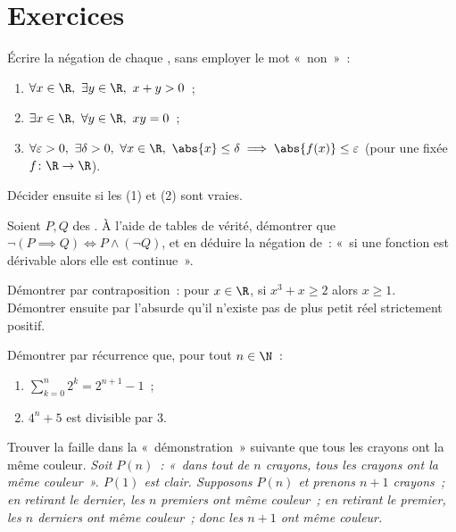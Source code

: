 \section{Exercices}

\begin{exercise}[$\star$]\label{exo:b1:logic:1}
Écrire la négation de chaque , sans employer le mot «~non~»~:
\begin{enumerate}
  \item $\forall x \in \R,\ \exists y \in \R,\ x + y > 0$~;
  \item $\exists x \in \R,\ \forall y \in \R,\ xy = 0$~;
  \item $\forall \varepsilon > 0,\ \exists \delta > 0,\ \forall x \in
        \R,\ \abs{x} \leq \delta \implies \abs{f(x)} \leq \varepsilon$
        (pour une  fixée $f \colon \R \to \R$).
\end{enumerate}
Décider ensuite si les  (1) et (2) sont vraies.
\end{exercise}

\begin{exercise}[$\star$]\label{exo:b1:logic:2}
Soient $P, Q$ des . À l'aide de tables de vérité, démontrer
que $\lnot(P \implies Q) \iff P \land (\lnot Q)$, et en déduire la
négation de~: «~si une fonction est dérivable alors elle est
continue~».
\end{exercise}

\begin{exercise}[$\star$]\label{exo:b1:logic:3}
Démontrer par contraposition~: pour $x \in \R$, si $x^3 + x \geq 2$
alors $x \geq 1$. Démontrer ensuite par l'absurde qu'il n'existe pas de
plus petit réel strictement positif.
\end{exercise}

\begin{exercise}[$\star$]\label{exo:b1:logic:4}
Démontrer par récurrence que, pour tout $n \in \N$~:
\begin{enumerate}
  \item $\sum_{k=0}^{n} 2^k = 2^{n+1} - 1$~;
  \item $4^n + 5$ est divisible par $3$.
\end{enumerate}
\end{exercise}

\begin{exercise}[$\star$]\label{exo:b1:logic:5}
Trouver la faille dans la «~démonstration~» suivante que tous les
crayons ont la même couleur. \emph{Soit $P(n)$~: «~dans tout 
de $n$ crayons, tous les crayons ont la même couleur~». $P(1)$ est
clair. Supposons $P(n)$ et prenons $n+1$ crayons~; en retirant le
dernier, les $n$ premiers ont même couleur~; en retirant le premier,
les $n$ derniers ont même couleur~; donc les $n+1$ ont même couleur.}
\end{exercise}


